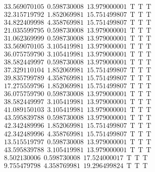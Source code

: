 \documentclass[10pt,a4paper]{article}
\begin{document}
\begin{itemize}
		\begin{displaymath}
			\boxed{
				\begin{aligned}
&33.569070105 ~~   0.598730008 ~~  13.979000001  ~~\mathrm{T  ~~ T  ~~ T } \\ 
&32.315719792 ~~   1.852069981 ~~  15.751499807  ~~\mathrm{T  ~~ T  ~~ T } \\ 
&34.822409998 ~~   4.358769981 ~~  15.751499807  ~~\mathrm{T  ~~ T  ~~ T } \\ 
&21.035599795 ~~   0.598730008 ~~  13.979000001  ~~\mathrm{T  ~~ T  ~~ T } \\ 
&31.062369999 ~~   0.598730008 ~~  13.979000001  ~~\mathrm{T  ~~ T  ~~ T } \\ 
&33.569070105 ~~   3.105419981 ~~  13.979000001  ~~\mathrm{T  ~~ T  ~~ T } \\ 
&36.075759790 ~~   3.105419981 ~~  13.979000001  ~~\mathrm{T  ~~ T  ~~ T } \\ 
&38.582449997 ~~   0.598730008 ~~  13.979000001  ~~\mathrm{T  ~~ T  ~~ T } \\ 
&37.329110104 ~~   1.852069981 ~~  15.751499807  ~~\mathrm{T  ~~ T  ~~ T } \\ 
&39.835799789 ~~   4.358769981 ~~  15.751499807  ~~\mathrm{T  ~~ T  ~~ T } \\ 
&17.275559796 ~~   1.852069981 ~~  15.751499807  ~~\mathrm{T  ~~ T  ~~ T } \\ 
&36.075759790 ~~   0.598730008 ~~  13.979000001  ~~\mathrm{T  ~~ T  ~~ T } \\ 
&38.582449997 ~~   3.105419981 ~~  13.979000001  ~~\mathrm{T  ~~ T  ~~ T } \\ 
&41.089150103 ~~   3.105419981 ~~  13.979000001  ~~\mathrm{T  ~~ T  ~~ T } \\ 
&43.595839788 ~~   0.598730008 ~~  13.979000001  ~~\mathrm{T  ~~ T  ~~ T } \\ 
&42.342489996 ~~   1.852069981 ~~  15.751499807  ~~\mathrm{T  ~~ T  ~~ T } \\ 
&42.342489996 ~~   4.358769981 ~~  15.751499807  ~~\mathrm{T  ~~ T  ~~ T } \\ 
&13.515519797 ~~   0.598730008 ~~  13.979000001  ~~\mathrm{T  ~~ T  ~~ T } \\ 
&43.595839788 ~~   3.105419981 ~~  13.979000001  ~~\mathrm{T  ~~ T  ~~ T } \\ 
& 8.502130006 ~~   0.598730008 ~~  17.524000017  ~~\mathrm{T  ~~ T  ~~ T } \\ 
& 9.755479798 ~~   4.358769981 ~~  19.296499824  ~~\mathrm{T  ~~ T  ~~ T } \\ 

\end{aligned}}
\end{displaymath}
\end{itemize}
\end{document}
